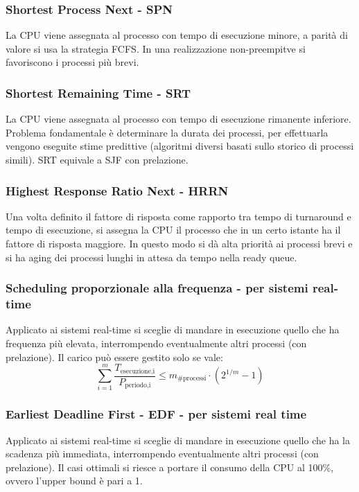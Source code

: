 \documentclass[a4paper]{article}
\begin{document}
\subsubsection*{Shortest Process Next - SPN}
La CPU viene assegnata al processo con tempo di esecuzione minore, a parità di valore si usa la strategia FCFS. In una
realizzazione non-preempitve si favoriscono i processi più brevi.

\subsubsection*{Shortest Remaining Time - SRT}
La CPU viene assegnata al processo con tempo di esecuzione rimanente inferiore. Problema fondamentale è determinare la durata
dei processi, per effettuarla vengono eseguite stime predittive (algoritmi diversi basati sullo storico di processi simili).
SRT equivale a SJF con prelazione.

\subsubsection*{Highest Response Ratio Next - HRRN}
Una volta definito il fattore di risposta come rapporto tra tempo di turnaround e tempo di esecuzione, si assegna la CPU il
processo che in un certo istante ha il fattore di risposta maggiore. In questo modo si dà alta priorità ai processi brevi e
si ha aging dei processi lunghi in attesa da tempo nella ready queue.

\subsubsection*{Scheduling proporzionale alla frequenza - per sistemi real-time}
Applicato ai sistemi real-time si sceglie di mandare in esecuzione quello che ha frequenza più elevata, interrompendo
eventualmente altri processi (con prelazione). Il carico può essere gestito solo se vale:
\[\sum_{i=1}^{m} \frac{T_\text{esecuzione,i}}{P_\text{periodo,i}} \leq m_\text{\# processi} \cdot (2^{1/m} - 1)\]

\subsubsection*{Earliest Deadline First - EDF - per sistemi real time}
Applicato ai sistemi real-time si sceglie di mandare in esecuzione quello che ha la scadenza più immediata, interrompendo
eventualmente altri processi (con prelazione). Il casi ottimali si riesce a portare il consumo della CPU al 100\%, ovvero
l'upper bound è pari a 1.
\end{document}
